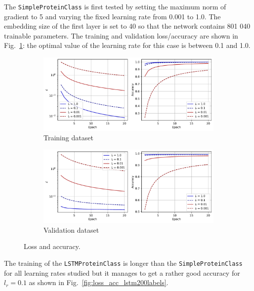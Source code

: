 \documentclass[12pt]{article}
\begin{document}
The \texttt{SimpleProteinClass} is first tested by setting the maximum norm of gradient to 5 and varying the fixed learning rate from 0.001 to 1.0. The embedding size of the first layer is set to 40 so that the network contains 801 040 trainable parameters. The training and validation loss/accuracy are shown in Fig.~\ref{fig:loss_acc_simple200labels}: the optimal value of the learning rate for this case is between 0.1 and 1.0.

\begin{figure}[htbp]
    \centering
    \begin{subfigure}{\textwidth}
        \includegraphics[width=\textwidth]{figures/loss_acc_simple200labels_train.pdf}
        \caption{Training dataset}
    \end{subfigure}
    \begin{subfigure}{\textwidth}
        \includegraphics[width=\textwidth]{figures/loss_acc_simple200labels_valid.pdf}
        \caption{Validation dataset}
    \end{subfigure}
    \caption{Loss and accuracy.}
    \label{fig:loss_acc_simple200labels}
\end{figure}

The training of the \texttt{LSTMProteinClass} is longer than the \texttt{SimpleProteinClass} for all learning rates studied but it manages to get a rather good accuracy for $l_r = 0.1$ as shown in Fig.~\ref{fig:loss_acc_lstm200labels}.
\end{document}
